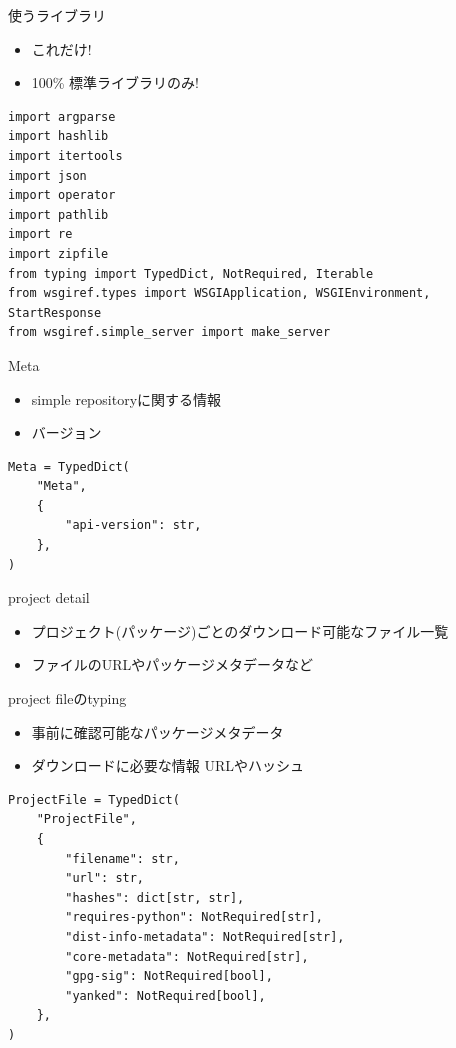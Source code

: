 \documentclass[presentation]{beamer}
\begin{document}
\begin{frame}[label={sec:org6b7f774},fragile]{使うライブラリ}
 \begin{itemize}
\item これだけ!
\item 100\% 標準ライブラリのみ!
\end{itemize}

\begin{verbatim}
import argparse
import hashlib
import itertools
import json
import operator
import pathlib
import re
import zipfile
from typing import TypedDict, NotRequired, Iterable
from wsgiref.types import WSGIApplication, WSGIEnvironment, StartResponse
from wsgiref.simple_server import make_server
\end{verbatim}
\end{frame}

\begin{frame}[label={sec:org56be3c1},fragile]{Meta}
 \begin{itemize}
\item simple repositoryに関する情報
\item バージョン
\end{itemize}

\begin{verbatim}
Meta = TypedDict(
    "Meta",
    {
        "api-version": str,
    },
)
\end{verbatim}
\end{frame}

\begin{frame}[label={sec:orgf086b3a}]{project detail}
\begin{itemize}
\item プロジェクト(パッケージ)ごとのダウンロード可能なファイル一覧
\item ファイルのURLやパッケージメタデータなど
\end{itemize}
\end{frame}

\begin{frame}[label={sec:org2c5222d},fragile]{project fileのtyping}
 \begin{itemize}
\item 事前に確認可能なパッケージメタデータ
\item ダウンロードに必要な情報 URLやハッシュ
\end{itemize}

\begin{verbatim}
ProjectFile = TypedDict(
    "ProjectFile",
    {
        "filename": str,
        "url": str,
        "hashes": dict[str, str],
        "requires-python": NotRequired[str],
        "dist-info-metadata": NotRequired[str],
        "core-metadata": NotRequired[str],
        "gpg-sig": NotRequired[bool],
        "yanked": NotRequired[bool],
    },
)

\end{verbatim}
\end{frame}
\end{document}
